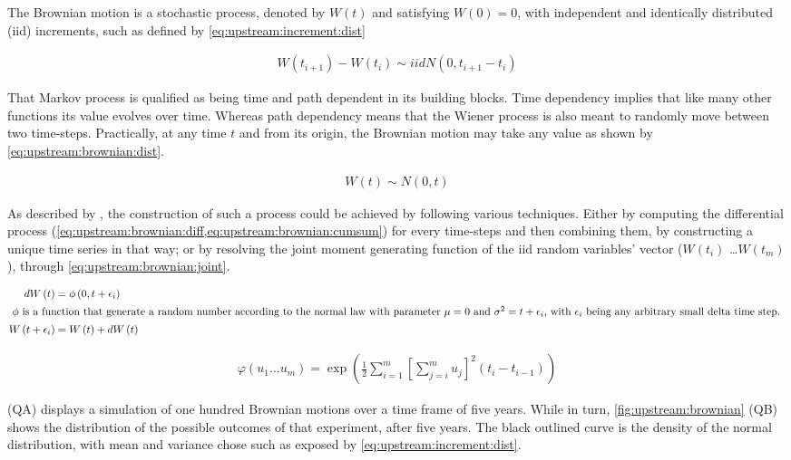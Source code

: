 \documentclass[12pt,a4paper]{report}
\newcommand{\Bm}{W\left(t\right)}
\begin{document}
The Brownian motion is a stochastic process, denoted by $\Bm$ and satisfying $W(0) = 0$, with independent and identically distributed (iid) increments, such as defined by \cref{eq:upstream:increment:dist}

\begin{align}
W(t_{i+1}) - W(t_i) \sim
  iid N \left(0, t_{i+1} - t_i\right) \label{eq:upstream:increment:dist}
\end{align}

That Markov process is qualified as being time and path dependent in its building blocks. Time dependency implies that like many other functions its value evolves over time. 
Whereas path dependency means that the Wiener process is also meant to randomly move between two time-steps.
Practically, at any time $t$ and from its origin, the Brownian motion may take any value as shown by \cref{eq:upstream:brownian:dist}.

\begin{align}
\Bm \sim N(0, t) \label{eq:upstream:brownian:dist}
\end{align}

As described by \citet{shreve}, the construction of such a process could be achieved by following various techniques. Either by computing the differential process (\cref{eq:upstream:brownian:diff,eq:upstream:brownian:cumsum}) for every time-steps and then combining them, by constructing a unique time series in that way; or by resolving the joint moment generating function of the iid random variables' vector ($W(t_i)$ \ldots $W(t_m)$), through \cref{eq:upstream:brownian:joint}.

\begin{align}
  d\Bm &= \phi \left(0, t + \epsilon_i \right) \label{eq:upstream:brownian:diff} \\
  \intertext{
  $\phi$ is a function that generate a random number according to the normal law with parameter $\mu = 0$ and $\sigma^2 = t + \epsilon_i$, with $\epsilon_i$ being any arbitrary small delta time step.
  }
  W\left(t + \epsilon_i\right) &= \Bm + d\Bm \label{eq:upstream:brownian:cumsum}
\end{align}

\begin{align}
  \varphi\left(u_1 \ldots u_m\right) = \exp{\left( \frac{1}{2} \sum_{i = 1}^m \left[ \sum_{j = i}^m u_j \right]^2 \left( t_i - t_{i-1} \right) \right)} \label{eq:upstream:brownian:joint}
\end{align}

 (QA) displays a simulation of one hundred Brownian motions over a time frame of five years. While in turn, \cref{fig:upstream:brownian} (QB) shows the distribution of the possible outcomes of that experiment, after five years. The black outlined curve is the density of the normal distribution, with mean and variance chose such as exposed by \cref{eq:upstream:increment:dist}.
\end{document}
